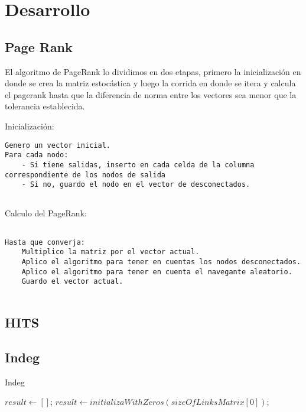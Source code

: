 \section{Desarrollo}

\subsection{Page Rank}
El algoritmo de PageRank lo dividimos en dos etapas, primero la inicializaci\'on en donde se crea la matriz estoc\'astica y luego la corrida en donde se itera y calcula el pagerank hasta que la diferencia de norma entre los vectores sea menor que la tolerancia establecida.

Inicializaci\'on:
\begin{lstlisting}[frame=single]  
Genero un vector inicial.
Para cada nodo:
	- Si tiene salidas, inserto en cada celda de la columna correspondiente de los nodos de salida
	- Si no, guardo el nodo en el vector de desconectados.
	
\end{lstlisting}

Calculo del PageRank:
\begin{lstlisting}[frame=single] 

Hasta que converja:
	Multiplico la matriz por el vector actual.
	Aplico el algoritmo para tener en cuentas los nodos desconectados.
	Aplico el algoritmo para tener en cuenta el navegante aleatorio.
	Guardo el vector actual.
	
\end{lstlisting}


\subsection{HITS}

\subsection{Indeg}

\begin{algorithm}
\caption{Indeg}\label{euclid}
\begin{algorithmic}[1]
\State $result \gets []$;
\State $result \gets initializaWithZeros(sizeOfLinksMatrix[0])$;
	\ENDFOR
\ENDFOR
\end{algorithmic}
\end{algorithm}
